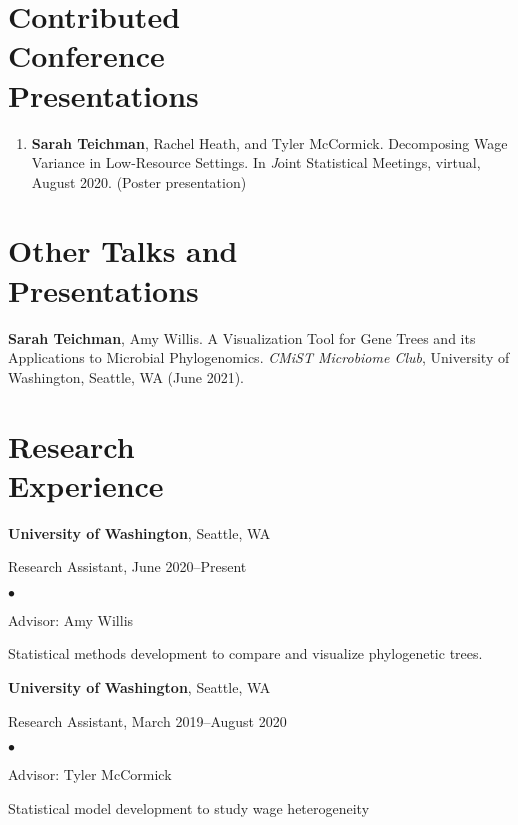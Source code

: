 \documentclass[margin,centered]{res}
\newenvironment{list1}{
  \begin{list}{\ding{113}}{%
      \setlength{\itemsep}{0in}
      \setlength{\parsep}{0in} \setlength{\parskip}{0in}
      \setlength{\topsep}{0in} \setlength{\partopsep}{0in}
      \setlength{\leftmargin}{0.17in}}}{\end{list}}
\newenvironment{list2}{
  \begin{list}{$\bullet$}{%
      \setlength{\itemsep}{0in}
      \setlength{\parsep}{0in} \setlength{\parskip}{0in}
      \setlength{\topsep}{0in} \setlength{\partopsep}{0in}
      \setlength{\leftmargin}{0.2in}}}{\end{list}}
\begin{document}
\begin{resume}
\section{\sc Contributed\\ Conference\\ Presentations}
\begin{enumerate}[leftmargin=*]
\item {\bf Sarah Teichman}, Rachel Heath, and Tyler McCormick. Decomposing Wage Variance in Low-Resource Settings. In {\emph Joint Statistical Meetings}, virtual, August 2020. (Poster presentation)
\end{enumerate}

\section{\sc Other Talks and \\ Presentations}

\textbf{Sarah Teichman}, Amy Willis. A Visualization Tool for Gene Trees and its Applications to Microbial Phylogenomics. \emph{CMiST Microbiome Club}, University of Washington, Seattle, WA (June 2021).

\section{\sc Research\\ Experience}
{\bf University of Washington},  Seattle, WA
\begin{list1}
\item[] 
Research Assistant, June 2020--Present
\begin{list2}
\vspace*{.05in}
\item Advisor: Amy Willis
\item Statistical methods development to compare and visualize phylogenetic trees. 
\end{list2} 
\end{list1}


{\bf University of Washington},  Seattle, WA
\begin{list1}
\item[] 
Research Assistant, March 2019--August 2020
\begin{list2}
\vspace*{.05in}
\item Advisor: Tyler McCormick
\item Statistical model development to study wage heterogeneity
\end{list2} 
\end{list1}



\end{resume}
\end{document}
